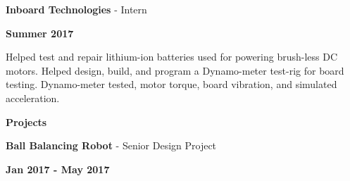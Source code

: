 \documentclass[paper=a4,fontsize=11pt]{article} %
\def \sectionSpace      {0.7cm}     %
\def \subSectionSpace   {0.3cm}     %
\def \leftColSpace      {0.12}      %
\def \middleColSpace    {0.675}     %
\def \bigMiddleColSpace {0.875}     %
\def \rightColSpace     {0.25}      %
\begin{document}
    \filbreak
    \noindent
    \begin{minipage}[t]{\leftColSpace\linewidth}
        \hfill
    \end{minipage}
    \begin{minipage}[t]{\middleColSpace\linewidth}
        \vspace{\subSectionSpace}
        \noindent \textbf{Inboard Technologies} - Intern
    \end{minipage}
    \begin{minipage}[t]{\rightColSpace\linewidth}
        \begin{flushleft}
            \vspace{\subSectionSpace}
            \noindent \textbf{Summer 2017}
        \end{flushleft}
    \end{minipage}

    \noindent
    \begin{minipage}[t]{\leftColSpace\linewidth}
        \hfill
    \end{minipage}
    \begin{minipage}[t]{\bigMiddleColSpace\linewidth}
        Helped test and repair lithium-ion batteries used for powering brush-less DC motors. Helped design, build, and program a Dynamo-meter test-rig for board testing. Dynamo-meter tested, motor torque, board vibration, and simulated acceleration.\\
    \end{minipage}


    \noindent
    \begin{minipage}[t]{\leftColSpace\linewidth}
        \noindent \textbf{Projects}
    \end{minipage}
    \begin{minipage}[t]{\middleColSpace\linewidth}
        \vspace{\subSectionSpace}
        \noindent \textbf{Ball Balancing Robot } - Senior Design Project
    \end{minipage}
    \begin{minipage}[t]{\rightColSpace\linewidth}
        \begin{flushleft}
            \vspace{\subSectionSpace}
            \noindent \textbf{Jan 2017 - May 2017}
        \end{flushleft}
    \end{minipage}
\end{document}
